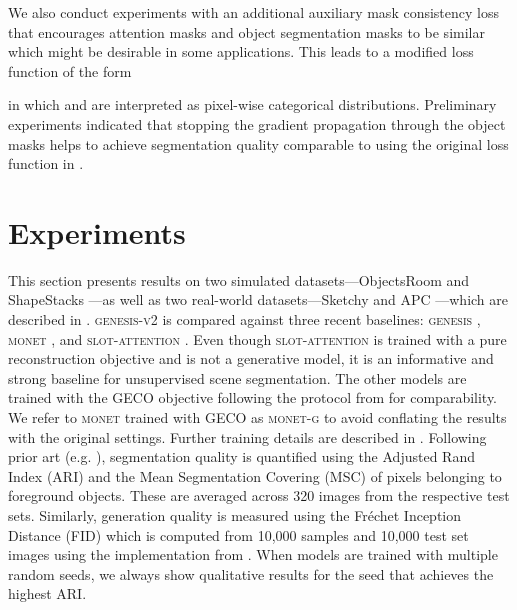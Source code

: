 \documentclass{article}
\begin{document}
We also conduct experiments with an additional auxiliary mask consistency loss that encourages attention masks  and object segmentation masks  to be similar which might be desirable in some applications.
This leads to a modified loss function of the form

in which  and  are interpreted as pixel-wise categorical distributions.
Preliminary experiments indicated that stopping the gradient propagation through the object masks  helps to achieve segmentation quality comparable to using the original loss function in .

\section{Experiments}
\label{sec:experiments}

This section presents results on two simulated datasets---ObjectsRoom \cite{multiobjectdatasets19} and ShapeStacks \cite{groth2018shapestacks}---as well as two real-world datasets---Sketchy \cite{cabi2019scaling} and APC \cite{zeng2016multi}---which are described in .
\textsc{genesis-v2} is compared against three recent baselines: \textsc{genesis} \cite{engelcke2020genesis}, \textsc{monet} \cite{burgess2019monet}, and \textsc{slot-attention} \cite{locatello2020object}.
Even though \textsc{slot-attention} is trained with a pure reconstruction objective and is not a generative model, it is an informative and strong baseline for unsupervised scene segmentation.
The other models are trained with the GECO objective \cite{rezende2018taming} following the protocol from \citet{engelcke2020genesis} for comparability.
We refer to \textsc{monet} trained with GECO as \textsc{monet-g} to avoid conflating the results with the original settings.
Further training details are described in .
Following prior art (e.g. \cite{greff2019multi,engelcke2020genesis,engelcke2020reconstruction,locatello2020object}), segmentation quality is quantified using the Adjusted Rand Index (ARI) and the Mean Segmentation Covering (MSC) of pixels belonging to foreground objects.
These are averaged across 320 images from the respective test sets.
Similarly, generation quality is measured using the Fr\'{e}chet Inception Distance (FID) \cite{heusel2017gans} which is computed from 10,000 samples and 10,000 test set images using the implementation from \citet{Seitzer2020FID}.
When models are trained with multiple random seeds, we always show qualitative results for the seed that achieves the highest ARI.
\end{document}
